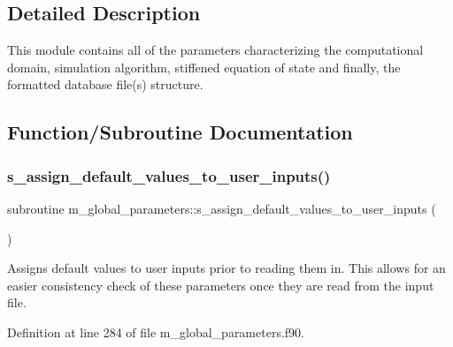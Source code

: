 \subsection{Detailed Description}
This module contains all of the parameters characterizing the computational domain, simulation algorithm, stiffened equation of state and finally, the formatted database file(s) structure. 

\subsection{Function/\+Subroutine Documentation}
\mbox{\label{namespacem__global__parameters_a433eac37597eb46a3cac84ca0471f5d3}} 
\subsubsection{\texorpdfstring{s\+\_\+assign\+\_\+default\+\_\+values\+\_\+to\+\_\+user\+\_\+inputs()}{s\_assign\_default\_values\_to\_user\_inputs()}}
{\footnotesize\ttfamily subroutine m\+\_\+global\+\_\+parameters\+::s\+\_\+assign\+\_\+default\+\_\+values\+\_\+to\+\_\+user\+\_\+inputs (\begin{DoxyParamCaption}{ }\end{DoxyParamCaption})}



Assigns default values to user inputs prior to reading them in. This allows for an easier consistency check of these parameters once they are read from the input file. 



Definition at line 284 of file m\+\_\+global\+\_\+parameters.\+f90.

\mbox{\label{namespacem__global__parameters_aac1a5a73b1eae759c913983b38047167}} 
